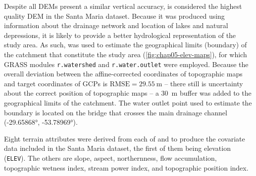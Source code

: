 

Despite all DEMs present a similar vertical accuracy, \demNew{} is considered the highest quality DEM in the 
Santa Maria dataset. Because it was produced using information about the drainage network and location of 
lakes 
and natural depressions, it is likely to provide a better hydrological representation of the study area. As 
such, \demNew{} was used to estimate the geographical limits (boundary) of the catchment that constitute the 
study area (\autoref{fig:chap05-elev-maps}), for which GRASS modules \texttt{r.watershed} and 
\texttt{r.water.outlet} were employed. Because the overall deviation between the affine-corrected coordinates 
of topographic maps and target coordinates of GCPs is $\text{RMSE} = \SI{29.55}{\m}$ -- there still is 
uncertainty about the correct position of topographic maps -- a \SI{30}{\m} buffer was added to the 
geographical limits of the catchment. The water outlet point used to estimate the boundary is located on the 
bridge that crosses the main drainage channel (\ang{-29.65868}, \ang{-53.78969}).

Eight terrain attributes were derived from each of \demOld{} and \demNew{} to produce the covariate data 
included in the Santa Maria dataset, the first of them being elevation (\texttt{ELEV}). The others are slope, 
aspect, northernness, flow accumulation, topographic wetness index, stream power index, and topographic 
position index.

